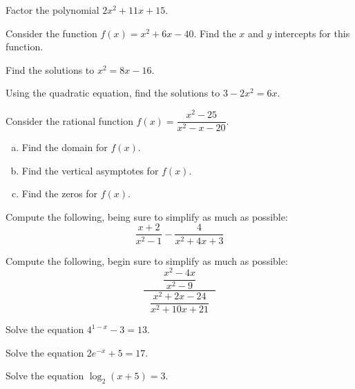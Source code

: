 \documentclass[12pt,letterpaper]{exam}
\begin{document}
\begin{questions}
\newpage
\question[5] Factor the polynomial $2x^2 + 11x + 15$.





\newpage
\question[5] Consider the function $f(x)= x^2 + 6x - 40$. Find the $x$ and $y$ intercepts for this function. 





\newpage
\question[5] Find the solutions to $x^2= 8x - 16$.





\newpage
\question[5] Using the quadratic equation, find the solutions to $3 - 2x^2= 6x$. 





\newpage
\question[10] Consider the rational function $f(x)= \dfrac{x^2 - 25}{x^2 - x - 20}$. 
\begin{enumerate}[(a)]
\item Find the domain for $f(x)$. 
\item Find the vertical asymptotes for $f(x)$. 
\item Find the zeros for $f(x)$. 
\end{enumerate}





\newpage
\question[5] Compute the following, being sure to simplify as much as possible: 
	\[
	\dfrac{x + 2}{x^2 - 1} - \dfrac{4}{x^2 + 4x + 3}
	\]  





\newpage
\question[5] Compute the following, begin sure to simplify as much as possible:
	\[
	\dfrac{\phantom{--}\dfrac{x^2 - 4x}{x^2 - 9}\phantom{--}}{\dfrac{x^2 + 2x - 24}{x^2 + 10x + 21}}
	\] 





\newpage
\question[5] Solve the equation $4^{1 - x} - 3= 13$.  





\newpage
\question[5] Solve the equation $2e^{-x} + 5= 17$. 





\newpage
\question[5] Solve the equation $\log_2(x + 5)= 3$. 






\end{questions}
\end{document}
